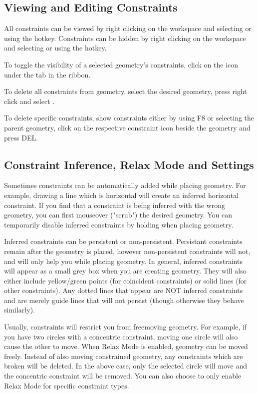 \subsection{Viewing and Editing Constraints}
\cbstart
All constraints can be viewed by right clicking on the workspace and selecting \newline {} or using the  hotkey. Constraints can be hidden by right clicking on the workspace and selecting  or using the  hotkey.

To toggle the visibility of a selected geometry's constraints, click on the  icon under the  tab in the ribbon.

To delete all constraints from geometry, select the desired geometry, press right click and select .

To delete specific constraints, show constraints either by using F8 or selecting the parent geometry, click on the respective constraint icon beside the geometry and press DEL.
\cbend
\subsection{Constraint Inference, Relax Mode and Settings}

\cbstart
{}

Sometimes constraints can be automatically added while placing geometry. For example, drawing a line which is horizontal will create an inferred horizontal constraint. If you find that a constraint is being inferred with the wrong geometry, you can first mouseover ("scrub") the desired geometry. You can temporarily disable inferred constraints by holding  when placing geometry.



Inferred constraints can be persistent or non-persistent. Persistant constraints remain after the geometry is placed, however non-persistent constraints will not, and will only help you while placing geometry. In general, inferred constraints will appear as a small grey box when you are creating geometry. They will also either include yellow/green points (for coincident constraints) or solid lines (for other constraints). Any dotted lines that appear are NOT inferred constraints and are merely guide lines that will not persist (though otherwise they behave similarly).

Usually, constraints will restrict you from freemoving geometry. For example, if you have two circles with a concentric constraint, moving one circle will also cause the other to move. When Relax Mode is enabled, geometry can be moved freely. Instead of also moving constrained geometry, any constraints which are broken will be deleted. In the above case, only the selected circle will move and the concentric constraint will be removed. You can also choose to only enable Relax Mode for specific constraint types.

